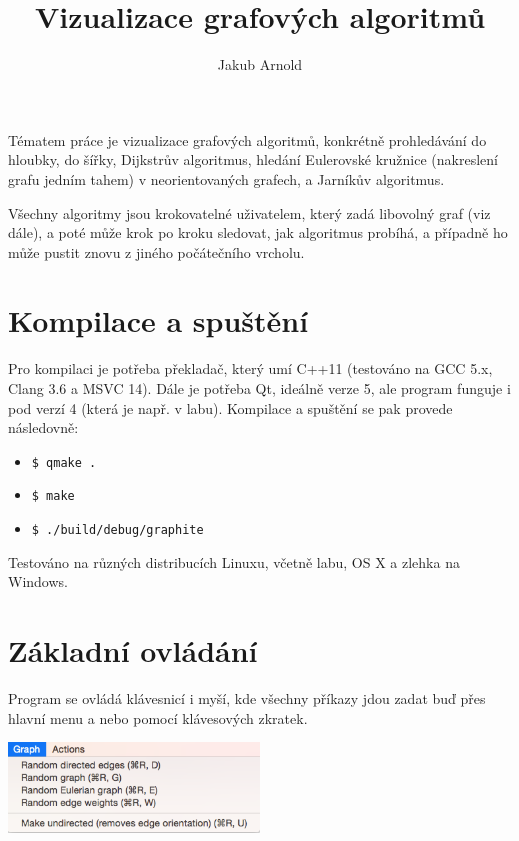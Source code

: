 \documentclass{article}
\title{Vizualizace grafových algoritmů}
\author{Jakub Arnold}
\date{}
\def\code#1{\texttt{#1}}
\begin{document}
\maketitle

Tématem práce je vizualizace grafových algoritmů, konkrétně prohledávání
do hloubky, do šířky, Dijkstrův algoritmus, hledání Eulerovské kružnice (nakreslení grafu jedním tahem)
v neorientovaných grafech, a Jarníkův algoritmus.

Všechny algoritmy jsou krokovatelné uživatelem, který zadá libovolný
graf (viz dále), a poté může krok po kroku sledovat, jak algoritmus
probíhá, a případně ho může pustit znovu z jiného počátečního vrcholu.

\section{Kompilace a spuštění}

Pro kompilaci je potřeba překladač, který umí C++11 (testováno na GCC 5.x, Clang 3.6 a MSVC 14).
Dále je potřeba Qt, ideálně verze 5, ale program funguje i pod verzí 4 (která je např. v labu).
Kompilace a spuštění se pak provede následovně:

\begin{itemize}
  \item \code{\$ qmake .}
  \item \code{\$ make}
  \item \code{\$ ./build/debug/graphite}
\end{itemize}

Testováno na různých distribucích Linuxu, včetně labu, OS X a zlehka na Windows.

\pagebreak

\section{Základní ovládání}

Program se ovládá klávesnicí i myší, kde všechny příkazy jdou zadat buď
přes hlavní menu a nebo pomocí klávesových zkratek.

\begin{center}
    \includegraphics[width=0.5\textwidth]{KJaB5S6.png}
\end{center}
\end{document}

